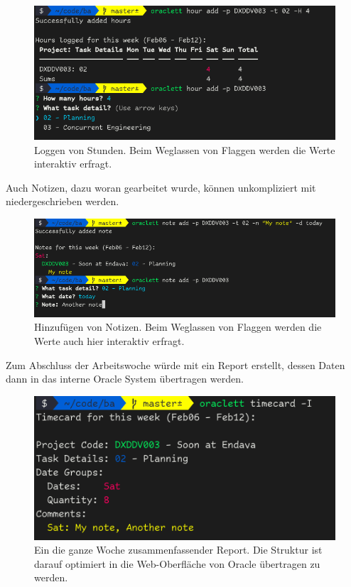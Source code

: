 \documentclass[oneside,bibliography=totocnumbered,BCOR=5mm]{scrbook}
\begin{document}
\begin{figure}[H]
  \centering
  \includegraphics[scale=0.55]{hours-add.png}
  \caption{Loggen von Stunden. Beim Weglassen von Flaggen werden die Werte interaktiv erfragt.}
  \label{lst:hour-add}
  \label{fig:hours-add}
\end{figure}

Auch Notizen, dazu woran gearbeitet wurde, können unkompliziert mit
 niedergeschrieben werden.

\begin{figure}[H]
  \centering
  \includegraphics[scale=0.5]{note-add.png}
  \caption{Hinzufügen von Notizen. Beim Weglassen von Flaggen werden die Werte auch hier interaktiv erfragt.}
  \label{fig:note-add}
\end{figure}

Zum Abschluss der Arbeitswoche würde mit  ein Report
erstellt, dessen Daten dann in das interne Oracle System übertragen werden.

\begin{figure}[H]
  \centering
  \includegraphics[scale=0.6]{timecard-ideal.png}
  \caption{Ein die ganze Woche zusammenfassender Report. Die Struktur ist darauf optimiert in die Web-Oberfläche von Oracle übertragen zu werden.}
  \label{fig:timecard}
\end{figure}
\end{document}
